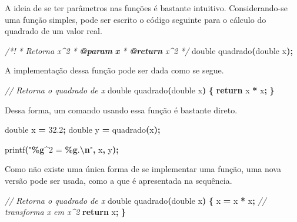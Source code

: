 \documentclass[
  11pt,
  a4paper,
]{scrbook}
\newenvironment{Shaded}{\begin{snugshade}}{\end{snugshade}}
\newcommand{\AnnotationTok}[1]{\textcolor[rgb]{0.56,0.35,0.01}{\textbf{\textit{#1}}}}
\newcommand{\CommentTok}[1]{\textcolor[rgb]{0.56,0.35,0.01}{\textit{#1}}}
\newcommand{\CommentVarTok}[1]{\textcolor[rgb]{0.56,0.35,0.01}{\textbf{\textit{#1}}}}
\newcommand{\ControlFlowTok}[1]{\textcolor[rgb]{0.13,0.29,0.53}{\textbf{#1}}}
\newcommand{\DataTypeTok}[1]{\textcolor[rgb]{0.13,0.29,0.53}{#1}}
\newcommand{\FloatTok}[1]{\textcolor[rgb]{0.00,0.00,0.81}{#1}}
\newcommand{\NormalTok}[1]{#1}
\newcommand{\OperatorTok}[1]{\textcolor[rgb]{0.81,0.36,0.00}{\textbf{#1}}}
\newcommand{\SpecialCharTok}[1]{\textcolor[rgb]{0.81,0.36,0.00}{\textbf{#1}}}
\newcommand{\StringTok}[1]{\textcolor[rgb]{0.31,0.60,0.02}{#1}}
\begin{document}
A ideia de se ter parâmetros nas funções é bastante intuitivo.
Considerando-se uma função simples, pode ser escrito o código seguinte
para o cálculo do quadrado de um valor real.

\begin{Shaded}
\begin{Highlighting}[]
\CommentTok{/*!}
\CommentTok{ * Retorna x\^{}2}
\CommentTok{ * }\AnnotationTok{@param}\CommentTok{ }\CommentVarTok{x}\CommentTok{ }
\CommentTok{ * }\AnnotationTok{@return}\CommentTok{ x\^{}2}
\CommentTok{ */}
\DataTypeTok{double}\NormalTok{ quadrado}\OperatorTok{(}\DataTypeTok{double}\NormalTok{ x}\OperatorTok{);}
\end{Highlighting}
\end{Shaded}

A implementação dessa função pode ser dada como se segue.

\begin{Shaded}
\begin{Highlighting}[]
\CommentTok{// Retorna o quadrado de x}
\DataTypeTok{double}\NormalTok{ quadrado}\OperatorTok{(}\DataTypeTok{double}\NormalTok{ x}\OperatorTok{)} \OperatorTok{\{}
    \ControlFlowTok{return}\NormalTok{ x }\OperatorTok{*}\NormalTok{ x}\OperatorTok{;}
\OperatorTok{\}}
\end{Highlighting}
\end{Shaded}

Dessa forma, um comando usando essa função é bastante direto.

\begin{Shaded}
\begin{Highlighting}[]
\DataTypeTok{double}\NormalTok{ x }\OperatorTok{=} \FloatTok{32.2}\OperatorTok{;}
\DataTypeTok{double}\NormalTok{ y }\OperatorTok{=}\NormalTok{ quadrado}\OperatorTok{(}\NormalTok{x}\OperatorTok{);}

\NormalTok{printf}\OperatorTok{(}\StringTok{"}\SpecialCharTok{\%g}\StringTok{\^{}2 = }\SpecialCharTok{\%g}\StringTok{.}\SpecialCharTok{\textbackslash{}n}\StringTok{"}\OperatorTok{,}\NormalTok{ x}\OperatorTok{,}\NormalTok{ y}\OperatorTok{);}
\end{Highlighting}
\end{Shaded}

Como não existe uma única forma de se implementar uma função, uma nova
versão pode ser usada, como a que é apresentada na sequência.

\begin{Shaded}
\begin{Highlighting}[]
\CommentTok{// Retorna o quadrado de x}
\DataTypeTok{double}\NormalTok{ quadrado}\OperatorTok{(}\DataTypeTok{double}\NormalTok{ x}\OperatorTok{)} \OperatorTok{\{}
\NormalTok{    x }\OperatorTok{=}\NormalTok{ x }\OperatorTok{*}\NormalTok{ x}\OperatorTok{;}  \CommentTok{// transforma x em x\^{}2}
    \ControlFlowTok{return}\NormalTok{ x}\OperatorTok{;}
\OperatorTok{\}}
\end{Highlighting}
\end{Shaded}
\end{document}
